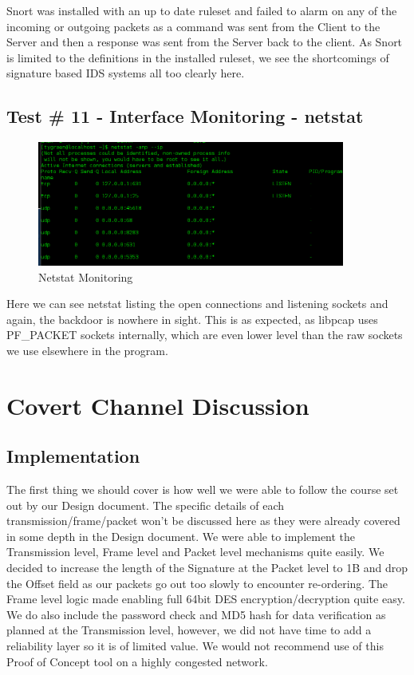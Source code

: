 \documentclass[titlepage]{article}
\begin{document}
Snort was installed with an up to date ruleset and failed to alarm on any of the incoming or outgoing packets as a command was sent from the Client to the Server and then a response was sent from the Server back to the client.  As Snort is limited to the definitions in the installed ruleset, we see the shortcomings of signature based IDS systems all too clearly here.

\subsection{Test \# 11 - Interface Monitoring - netstat}

\begin{figure}[htb]                                                                       
  \begin{center}
    \includegraphics[width=0.9\textwidth]{Pictures/netstat.png}
  \end{center}
  \caption{Netstat Monitoring}
  \label{fig:netstat}
\end{figure}

Here we can see netstat listing the open connections and listening sockets and again, the backdoor is nowhere in sight. This is as expected, as libpcap uses PF\_PACKET sockets internally, which are even lower level than the raw sockets we use elsewhere in the program.

\clearpage

\section{Covert Channel Discussion}

\subsection{Implementation}

The first thing we should cover is how well we were able to follow the course set out by our Design document.  The specific details of each transmission/frame/packet won't be discussed here as they were already covered in some depth in the Design document. We were able to implement the Transmission level, Frame level and Packet level mechanisms quite easily.  We decided to increase the length of the Signature at the Packet level to 1B and drop the Offset field as our packets go out too slowly to encounter re-ordering.  The Frame level logic made enabling full 64bit DES encryption/decryption quite easy.  We do also include the password check and MD5 hash for data verification as planned at the Transmission level, however, we did not have time to add a reliability layer so it is of limited value. We would not recommend use of this Proof of Concept tool on a highly congested network.
\end{document}
